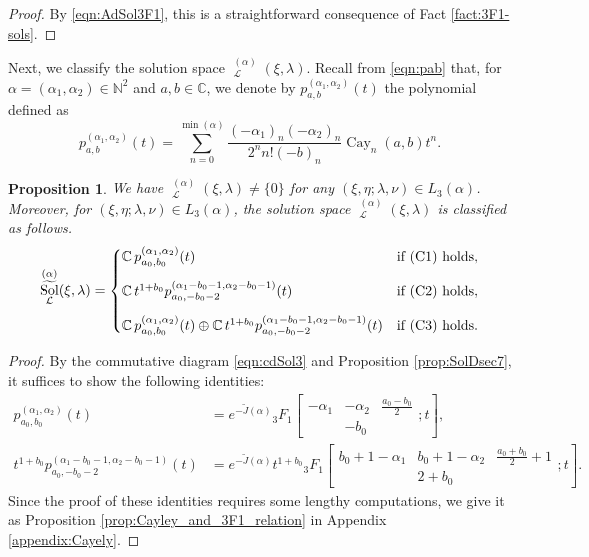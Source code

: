 \documentclass[a4paper,11pt,reqno]{amsart}
\newcommand{\CC}{\mathbb{C}}
\newcommand{\calL}{\mathcal{L}}
\newcommand{\0}{{\bf 0}}
\newcommand{\N}{\mathbb{N}}
\newcommand{\C}{\mathbb{C}}
\newcommand{\1}{{\bf 1}}
\DeclareMathOperator{\Cay}{Cay}
\DeclareMathOperator{\Sol}{Sol}
\newcommand{\wJ}{\widetilde{J}}
\DeclareMathOperator{\wSol}{\widetilde{\Sol}}
\theoremstyle{plain}
\newtheorem{proposition}[equation]{Proposition}
\theoremstyle{definition}
\numberwithin{equation}{section}
\theoremstyle{definition}
\begin{document}
\begin{proof}
By  \eqref{eqn:AdSol3F1},
this is a straightforward consequence of Fact \ref{fact:3F1-sols}.
 \end{proof}

Next, we classify the solution space $\wSol_\calL^{(\alpha)}(\xi,\lambda)$.
Recall from \eqref{eqn:pab} that,
for $\alpha=(\alpha_1,\alpha_2) \in \N^2$ and $a,b\in \C$, we denote by
$p^{(\alpha_1, \alpha_2)}_{a,b}(t)$ the polynomial defined as
\begin{equation}\label{eqn:pab1}
p_{a,b}^{(\alpha_1, \alpha_2)}(t)=\sum_{n=0}^{\min(\alpha)} \frac{(-\alpha_1)_n(-\alpha_2)_n}{2^nn!(-b)_n}\Cay_n(a,b)t^n.
\end{equation}

\begin{proposition}\label{Prop:SolGeneralDiffEq1}
We have
$\wSol_\calL^{(\alpha)}(\xi,\lambda)\neq \{0\}$
for any $(\xi, \eta; \lambda, \nu) \in L_3(\alpha)$.
Moreover, 
for $(\xi, \eta; \lambda, \nu) \in L_3(\alpha)$,
the solution space $\wSol_\calL^{(\alpha)}(\xi,\lambda)$ is classified as follows.
\begin{align*}
\wSol_\calL^{(\alpha)}(\xi,\lambda)
=
\begin{cases}
\CC\,
p_{a_0,b_0}^{(\alpha_1, \alpha_2)}(t)
& \textnormal{if (C1) holds},\\[10pt]
 \CC\,
t^{1+b_0}p_{a_0,-b_0-2}^{(\alpha_1-b_0-1,\alpha_2-b_0-1)}(t)
& \textnormal{if (C2) holds},\\[10pt]
\CC\, 
p_{a_0,b_0}^{(\alpha_1, \alpha_2)}(t)
\oplus \CC\,
t^{1+b_0}p_{a_0,-b_0-2}^{(\alpha_1-b_0-1,\alpha_2-b_0-1)}(t)
& \textnormal{if (C3) holds}.
\end{cases}
\end{align*}
\end{proposition}

\begin{proof}
By the commutative diagram \eqref{eqn:cdSol3}
and 
Proposition \ref{prop:SolDsec7}, it suffices to show the following identities:
\begin{align*}
p_{a_0,b_0}^{(\alpha_1,\alpha_2)}(t)
&=
e^{-\wJ(\alpha)}
{}_3F_1\left [\begin{matrix}
-\alpha_1& -\alpha_2 & \frac{a_0-b_0}{2} \\
& -b_0 &  
\end{matrix};t\right ],\\[5pt]
t^{1+b_0}p_{a_0,-b_0-2}^{(\alpha_1-b_0-1,\alpha_2-b_0-1)}(t)
&=
e^{-\wJ(\alpha)}
t^{1+b_0}{}_3F_1
\left [\begin{matrix}
b_0+1-\alpha_1& b_0+1-\alpha_2 & \frac{a_0+b_0}{2}+1 \\
& 2+b_0 &  
\end{matrix};t\right ].
\end{align*}
Since the proof of these identities requires some 
lengthy computations, we give it as 
Proposition \ref{prop:Cayley_and_3F1_relation} in 
Appendix \ref{appendix:Cayely}.
\end{proof}
\end{document}
